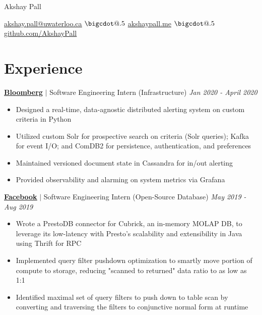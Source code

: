 \documentclass[paper=a4,fontsize=15pt]{scrartcl}
\makeatletter
\newcommand*\bigcdot{\mathpalette\bigcdot@{.5}}
\newcommand*\bigcdot@[2]{\mathbin{\vcenter{\hbox{\scalebox{#2}{$\m@th#1\bullet$}}}}}
\newcommand{\smolboispace}{\vspace*{0.1em}}
\newcommand{\halfspace}{\vspace*{0.5em}}
\newcommand{\bighalfspace}{\vspace*{0.75em}}
\newcommand{\http}[1]{\href{http://#1}{\ul{#1}}}
\newcommand{\https}[1]{\href{https://#1}{\ul{#1}}}
\newcommand{\email}[1]{\href{mailto:#1}{\ul{#1}}}
\makeatother
\begin{document}
\begin{center}
  {\fontsize{35}{40}\selectfont Akshay Pall \par}
  \halfspace
  \smolboispace
  \smolboispace

  {\normalsize
    \email{akshay.pall@uwaterloo.ca}
    $\bigcdot$ \http{akshaypall.me}
    $\bigcdot$ \https{github.com/AkshayPall}
    \par}
\end{center}

 \section*{Experience}{}
\normalsize
\noindent \href{https://bloomberg.com}{\textbf{\ul{Bloomberg}}}
$\vert$ \small Software Engineering Intern (Infrastructure)
{\hfill \footnotesize \textit{Jan 2020 - April 2020}}
\begin{itemize}[noitemsep,leftmargin=20pt,label=\raisebox{0.25ex}{\tiny$\bullet$},topsep=5pt]
  \small
 
  \item Designed a real-time, data-agnostic distributed alerting system on custom criteria in Python
    
  \item Utilized custom Solr for prospective search on criteria (Solr queries); Kafka for event I/O; and ComDB2 for persistence, authentication, and preferences

  \item Maintained versioned document state in Cassandra for in/out alerting
  
  \item Provided observability and alarming on system metrics via Grafana
  
\end{itemize}

\smolboispace
\smolboispace
\bighalfspace
\normalsize
\noindent \href{https://facebook.com}{\textbf{\ul{Facebook}}}
$\vert$ \small Software Engineering Intern (Open-Source Database)
{\hfill \footnotesize \textit{May 2019 - Aug 2019}}
\begin{itemize}[noitemsep,leftmargin=20pt,label=\raisebox{0.25ex}{\tiny$\bullet$},topsep=5pt]
  \small
    \item Wrote a PrestoDB connector for Cubrick, an in-memory MOLAP DB, to leverage its low-latency with Presto's scalability and extensibility in Java using Thrift for RPC
    \item Implemented query filter pushdown optimization to smartly move portion of compute to storage, reducing "scanned to returned" data ratio to as low as 1:1
    \item Identified maximal set of query filters to push down to table scan by converting and traversing the filters to conjunctive normal form at runtime
\end{itemize}
\end{document}
